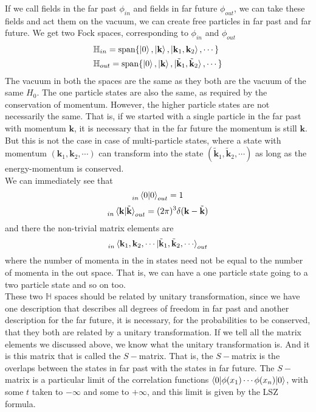 \documentclass[11pt]{article}
\numberwithin{equation}{section}
\begin{document}
    If we call fields in the far past \(\phi_{in}\) and fields in far future \(\phi_{out}\), we can take these fields and act them on the vacuum, we can create free particles in far past and far future. We get two Fock spaces, corresponding to \(\phi_{in}\) and \(\phi_{out}\)
    \begin{align*}
        &\mathbb{H}_{in} = \mathrm{span} \{ \ket{0}, \ket{\textbf{k}}, \ket{\textbf{k}_1, \textbf{k}_2}, \cdots \}\\
        &\mathbb{H}_{out} = \mathrm{span} \{ \ket{0}, \ket{\textbf{k}}, \ket{\tilde{\textbf{k}}_1, \tilde{\textbf{k}}_2}, \cdots \}
    \end{align*}
    The vacuum in both the spaces are the same as they both are the vacuum of the same \(H_0\). The one particle states are also the same, as required by the conservation of momentum. However, the higher particle states are not necessarily the same. That is, if we started with a single particle in the far past with momentum \(\textbf{k}\), it is necessary that in the far future the momentum is still \(\textbf{k}\). But this is not the case in case of multi-particle states, where a state with momentum \((\textbf{k}_1, \textbf{k}_2, \cdots)\) can transform into the state \((\tilde{\textbf{k}}_1, \tilde{\textbf{k}}_2, \cdots)\) as long as the energy-momentum is conserved. \\
    We can immediately see that 
    \begin{equation*}
        \indices{_{in}}\braket{0|0}_{out} = 1
    \end{equation*}
    \begin{equation*}
        \indices{_{in}}\braket{\textbf{k} | \tilde{\textbf{k}}}_{out} = (2\pi)^3\delta(\textbf{k} - \tilde{\textbf{k}})
    \end{equation*} 
    and there the non-trivial matrix elements are 
    \begin{equation*}
       \indices{_{in}}\braket{\textbf{k}_1, \textbf{k}_2, \cdots | \tilde{\textbf{k}}_1, \tilde{\textbf{k}}_2, \cdots}_{out}
    \end{equation*}
    where the number of momenta in the in states need not be equal to the number of momenta in the out space. That is, we can have a one particle state going to a two particle state and so on too. \\

    These two \(\mathbb{H}\) spaces should be related by unitary transformation, since we have one description that describes all degrees of freedom in far past and another description for the far future, it is necessary, for the probabilities to be conserved, that they both are related by a unitary transformation. If we tell all the matrix elements we discussed above, we know what the unitary transformation is. And it is this matrix that is called the \(S-\)matrix. That is, the \(S-\)matrix is the overlaps between the states in far past with the states in far future. The \(S-\)matrix is a particular limit of the correlation functions \(\braket{0|\phi(x_1) \cdots \phi(x_n)|0}\), with some \(t\) taken to \(-\infty\) and some to \(+\infty\), and this limit is given by the LSZ formula. \\
\end{document}
